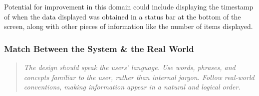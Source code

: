 \documentclass[a4paper,11pt]{report}
\begin{document}
Potential for improvement in this domain could include displaying the timestamp of when the data displayed was obtained in a status bar at the bottom of the screen, along with other pieces of information like the number of items displayed.

\subsubsection{Match Between the System \& the Real World}
\begin{quote}
    \textit{The design should speak the users' language. Use words, phrases, and concepts familiar to the user, rather than internal jargon. Follow real-world conventions, making information appear in a natural and logical order.}
\end{quote}
\end{document}
